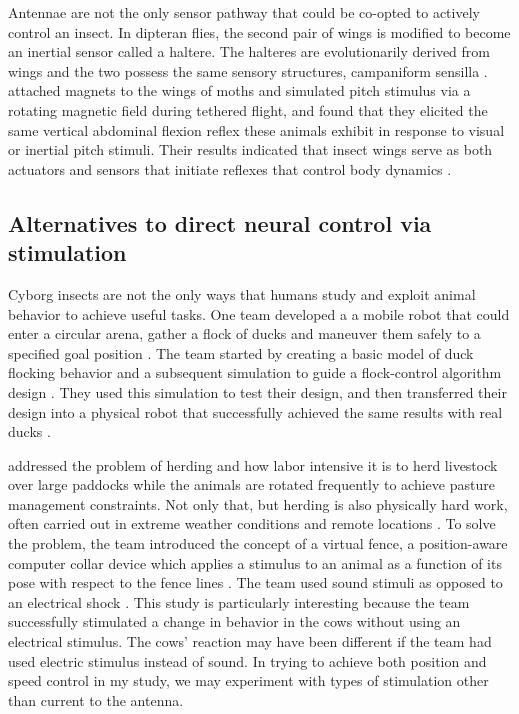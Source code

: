 \documentclass[twocolumn,10pt]{IEEEtran}
\begin{document}
Antennae are not the only sensor pathway that could be co-opted to actively control an insect. In dipteran flies, the second pair of wings is modified to become an inertial sensor called a haltere.  The halteres are evolutionarily derived from wings and the two possess the same sensory structures, campaniform sensilla \cite{Dickerson2014}. \cite{Dickerson2014} attached magnets to the wings of moths and simulated pitch stimulus via a rotating magnetic field during tethered flight, and found that they elicited the same vertical abdominal flexion reflex these animals exhibit in response to visual or inertial pitch stimuli. Their results indicated that insect wings serve as both actuators and sensors that initiate reflexes that control body dynamics \cite{Dickerson2014}.

\subsection{Alternatives to direct neural control via stimulation}
Cyborg insects are not the only ways that humans study and exploit animal behavior to achieve useful tasks. One team developed a a mobile robot that could enter a circular arena, gather a flock of ducks and maneuver them safely to a specified goal position \cite{robot}. The team started by creating a basic model of duck flocking behavior and a subsequent simulation to guide a flock-control algorithm design \cite{robot}. They used this simulation to test their design, and then transferred their design into a physical robot that successfully achieved the same results with real ducks \cite{robot}.

\cite{butler2004virtual} addressed the problem of herding and how labor intensive it is to herd livestock over large paddocks while the animals are rotated frequently to achieve pasture management constraints. Not only that, but herding is also physically hard work, often carried out in extreme weather conditions and remote locations \cite{butler2004virtual}. To solve the problem, the team introduced the concept of a virtual fence, a position-aware computer collar device which applies a stimulus to an animal as a function of its pose with respect to the fence lines \cite{butler2004virtual}. The team used sound stimuli as opposed to an electrical shock \cite{butler2004virtual}. This study is particularly interesting because the team successfully stimulated a change in behavior in the cows without using an electrical stimulus. The cows' reaction may have been different if the team had used electric stimulus instead of sound. In trying to achieve both position and speed control in my study, we may experiment with types of stimulation other than current to the antenna.
\end{document}

